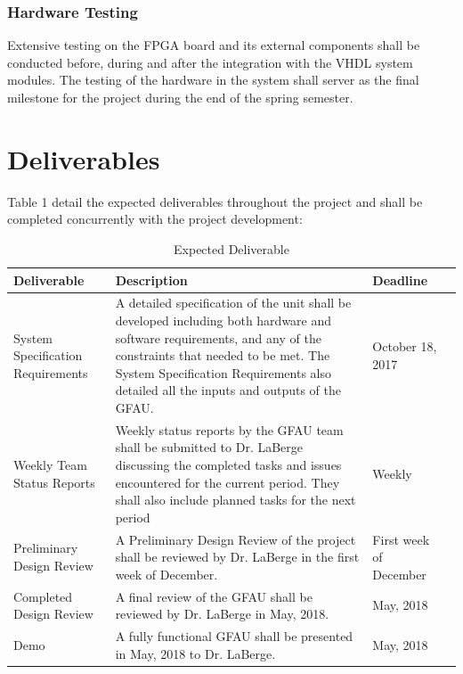 \documentclass[paper=usletter, fontsize=12pt]{article}
\begin{document}
            \subsubsection{Hardware Testing}Extensive testing on the FPGA board and its external components shall be conducted before, during and after the integration with the VHDL system modules. The testing of the hardware in the system shall server as the final milestone for the project during the end of the spring semester. 

    \section{Deliverables}Table 1 detail the expected deliverables throughout the project and shall be completed concurrently with the project development:

   \begin{table}[h]
   \caption{Expected Deliverable}
    
 \begin{center}
 	
    \begin{tabular}{ | p{5cm} | p{7cm} | l | p{5cm} |}
    
    \hline
    
    Deliverable & Description & Deadline \\ \hline
    System Specification Requirements & A detailed specification of the unit shall be developed including both hardware and software requirements, and any of the constraints that needed to be met. The System Specification Requirements also detailed all the inputs and outputs of the GFAU. & October 18, 2017
    \\ \hline
   Weekly Team Status Reports & Weekly status reports by the GFAU team shall be submitted to Dr. LaBerge discussing the completed tasks and issues encountered for the current period. They shall also include planned tasks for the next period & Weekly\\ \hline
    Preliminary Design Review & A Preliminary Design Review of the project shall be reviewed by Dr. LaBerge in the first week of December. & First week of December \\ \hline
    
    Completed Design Review & A final review of the GFAU shall be reviewed by Dr. LaBerge in May, 2018. & May, 2018 \\ \hline
    
    Demo & A fully functional GFAU shall be presented in May, 2018 to Dr. LaBerge. & May, 2018 \\ \hline
    \end{tabular}
    
\end{center}
\end{table}
\newpage
\end{document}
